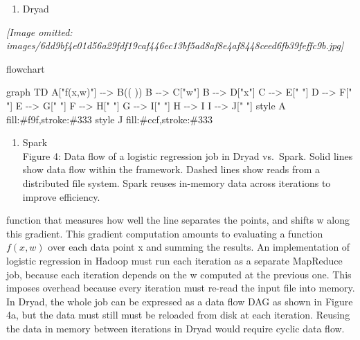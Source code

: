 \documentclass[
]{article}
\newenvironment{Shaded}{}{}
\newcommand{\NormalTok}[1]{#1}
\providecommand{\tightlist}{%
  \setlength{\itemsep}{0pt}\setlength{\parskip}{0pt}}
\begin{document}
\begin{enumerate}
\def\labelenumi{\alph{enumi})}
\tightlist
\item
  Dryad
\end{enumerate}

\textit{[Image omitted: images/6dd9bf4e01d56a29fdf19caf446ec13bf5ad8af8e4af8448ceed6fb39feffc9b.jpg]}

flowchart

\begin{Shaded}
\begin{Highlighting}[]
\NormalTok{graph TD}
\NormalTok{    A["f(x,w)"] {-}{-}\textgreater{} B(( ))}
\NormalTok{    B {-}{-}\textgreater{} C["w"]}
\NormalTok{    B {-}{-}\textgreater{} D["x"]}
\NormalTok{    C {-}{-}\textgreater{} E[" "]}
\NormalTok{    D {-}{-}\textgreater{} F[" "]}
\NormalTok{    E {-}{-}\textgreater{} G[" "]}
\NormalTok{    F {-}{-}\textgreater{} H[" "]}
\NormalTok{    G {-}{-}\textgreater{} I[" "]}
\NormalTok{    H {-}{-}\textgreater{} I}
\NormalTok{    I {-}{-}\textgreater{} J[" "]}
\NormalTok{    style A fill:\#f9f,stroke:\#333}
\NormalTok{    style J fill:\#ccf,stroke:\#333}
\end{Highlighting}
\end{Shaded}

\begin{enumerate}
\def\labelenumi{\alph{enumi})}
\setcounter{enumi}{1}
\tightlist
\item
  Spark\\
  Figure 4: Data flow of a logistic regression job in Dryad vs.~Spark.
  Solid lines show data flow within the framework. Dashed lines show
  reads from a distributed file system. Spark reuses in-memory data
  across iterations to improve efficiency.
\end{enumerate}

function that measures how well the line separates the points, and
shifts w along this gradient. This gradient computation amounts to
evaluating a function \(f(x,w)\) over each data point x and summing the
results. An implementation of logistic regression in Hadoop must run
each iteration as a separate MapReduce job, because each iteration
depends on the w computed at the previous one. This imposes overhead
because every iteration must re-read the input file into memory. In
Dryad, the whole job can be expressed as a data flow DAG as shown in
Figure 4a, but the data must still must be reloaded from disk at each
iteration. Reusing the data in memory between iterations in Dryad would
require cyclic data flow.
\end{document}
